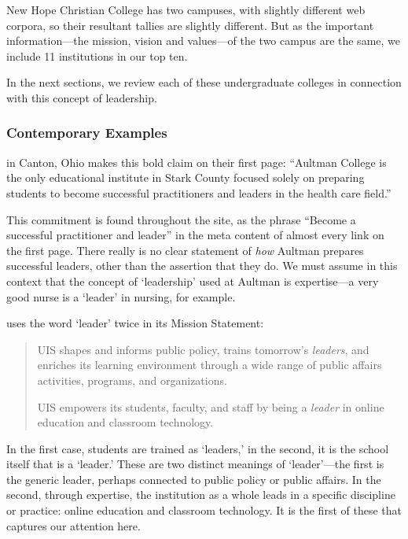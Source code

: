 New Hope Christian College has two campuses, with slightly different web corpora, so their resultant tallies are slightly different. But as the important information---the mission, vision and values---of the two campus are the same, we include 11 institutions in our top ten.

In the next sections, we review each of these undergraduate colleges in connection with this concept of leadership.

\subsubsection{Contemporary Examples}
\label{contemporaryexamples}

 in Canton, Ohio makes this bold claim on their first page: ``Aultman College is the only educational institute in Stark County focused solely on preparing students to become successful practitioners and leaders in the health care field.''

This commitment is found throughout the site, as the phrase ``Become a successful practitioner and leader'' in the meta content of almost every link on the first page. There really is no clear statement of \emph{how} Aultman prepares successful leaders, other than the assertion that they do. We must assume in this context that the concept of `leadership' used at Aultman is expertise---a very good nurse is a `leader' in nursing, for example.

 uses the word `leader' twice in its Mission Statement:

\begin{quote}

UIS shapes and informs public policy, trains tomorrow's \emph{leaders}, and enriches its learning environment through a wide range of public affairs activities, programs, and organizations.

UIS empowers its students, faculty, and staff by being a \emph{leader} in online education and classroom technology.
\end{quote}

In the first case, students are trained as `leaders,' in the second, it is the school itself that is a `leader.' These are two distinct meanings of `leader'---the first is the generic leader, perhaps connected to public policy or public affairs. In the second, through expertise, the institution as a whole leads in a specific discipline or practice: online education and classroom technology. It is the first of these that captures our attention here.

